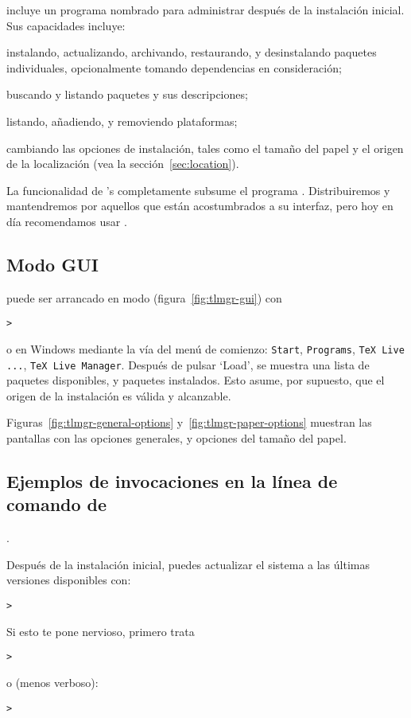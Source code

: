 \documentclass{article}
\begin{document}
\TL{} incluye un programa nombrado  para administrar \TL{}
después de la instalación inicial. Sus capacidades incluye:

\begin{itemize*}
\item instalando, actualizando, archivando, restaurando, y
	desinstalando paquetes individuales, opcionalmente tomando
	dependencias en consideración;
\item buscando y listando paquetes y sus descripciones;
\item listando, añadiendo, y removiendo plataformas;
\item cambiando las opciones de instalación, tales como el tamaño del
	papel y el origen de la localización (vea la
	sección~\ref{sec:location}).
\end{itemize*}

La funcionalidad de 's completamente subsume el programa
. Distribuiremos y mantendremos  por
aquellos que están acostumbrados a su interfaz, pero hoy en día
recomendamos usar . 

\subsection{ Modo GUI}
 puede ser arrancado en modo \GUI{}
(figura~\ref{fig:tlmgr-gui}) con
\begin{alltt}
> 
\end{alltt}
o en Windows mediante la vía del menú de comienzo: \texttt{Start},
\texttt{Programs}, \texttt{TeX Live ...}, \texttt{TeX Live Manager}.
Después de pulsar `Load', se muestra una lista de paquetes disponibles, y
paquetes instalados. Esto asume, por supuesto, que el origen de la
instalación es válida y alcanzable. 

Figuras~\ref{fig:tlmgr-general-options} y~\ref{fig:tlmgr-paper-options}
muestran las pantallas con las opciones generales, y opciones del tamaño
del papel.

\subsection{Ejemplos de invocaciones en la línea de comando de
}. 

Después de la instalación inicial, puedes actualizar el sistema a las
últimas versiones disponibles con: 
\begin{alltt}
> 
\end{alltt}
Si esto te pone nervioso, primero trata
\begin{alltt}
> 
\end{alltt}
o (menos verboso):
\begin{alltt}
> 
\end{alltt}
\end{document}
